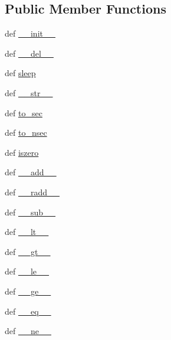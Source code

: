 \subsection*{Public Member Functions}
\begin{DoxyCompactItemize}
\item 
def \hyperlink{classcyber__py_1_1cyber__time_1_1Duration_a08565e30a168564babacbf88550df9b5}{\-\_\-\-\_\-init\-\_\-\-\_\-}
\item 
def \hyperlink{classcyber__py_1_1cyber__time_1_1Duration_aec663fca7762f1343902eda1a13843ea}{\-\_\-\-\_\-del\-\_\-\-\_\-}
\item 
def \hyperlink{classcyber__py_1_1cyber__time_1_1Duration_af9c3391683f8d3c6a1c1850c31aa3b83}{sleep}
\item 
def \hyperlink{classcyber__py_1_1cyber__time_1_1Duration_a5d1da6e53fad943b6d47f25fe2e9d93a}{\-\_\-\-\_\-str\-\_\-\-\_\-}
\item 
def \hyperlink{classcyber__py_1_1cyber__time_1_1Duration_a05685d23f3a6ee64cbffcb2264a2641c}{to\-\_\-sec}
\item 
def \hyperlink{classcyber__py_1_1cyber__time_1_1Duration_a6af1ecab94c554db69f8c19196ad3d49}{to\-\_\-nsec}
\item 
def \hyperlink{classcyber__py_1_1cyber__time_1_1Duration_a16c36cf42d30517232088bedb5ddef7d}{iszero}
\item 
def \hyperlink{classcyber__py_1_1cyber__time_1_1Duration_a7aaf4ec01986982cd51fe1ed482269c1}{\-\_\-\-\_\-add\-\_\-\-\_\-}
\item 
def \hyperlink{classcyber__py_1_1cyber__time_1_1Duration_ab7e6d0b5e6a1e45f4606651e598323fa}{\-\_\-\-\_\-radd\-\_\-\-\_\-}
\item 
def \hyperlink{classcyber__py_1_1cyber__time_1_1Duration_a6a5276bb0333ce402698d77130e33c2d}{\-\_\-\-\_\-sub\-\_\-\-\_\-}
\item 
def \hyperlink{classcyber__py_1_1cyber__time_1_1Duration_ab591c069f725358676fffa4ac52a8530}{\-\_\-\-\_\-lt\-\_\-\-\_\-}
\item 
def \hyperlink{classcyber__py_1_1cyber__time_1_1Duration_ab4335bbfd55672f8ac20c2f1ea1f7fa5}{\-\_\-\-\_\-gt\-\_\-\-\_\-}
\item 
def \hyperlink{classcyber__py_1_1cyber__time_1_1Duration_aca5d7aad25c073f58d7f774e491f7ea4}{\-\_\-\-\_\-le\-\_\-\-\_\-}
\item 
def \hyperlink{classcyber__py_1_1cyber__time_1_1Duration_ab09a3f314504a602e35b748e8e47e7d9}{\-\_\-\-\_\-ge\-\_\-\-\_\-}
\item 
def \hyperlink{classcyber__py_1_1cyber__time_1_1Duration_af62889ca6bcea88a6d38ec9d4c7c1631}{\-\_\-\-\_\-eq\-\_\-\-\_\-}
\item 
def \hyperlink{classcyber__py_1_1cyber__time_1_1Duration_a641308cf22a8f5d49989c43c9648d443}{\-\_\-\-\_\-ne\-\_\-\-\_\-}
\end{DoxyCompactItemize}
